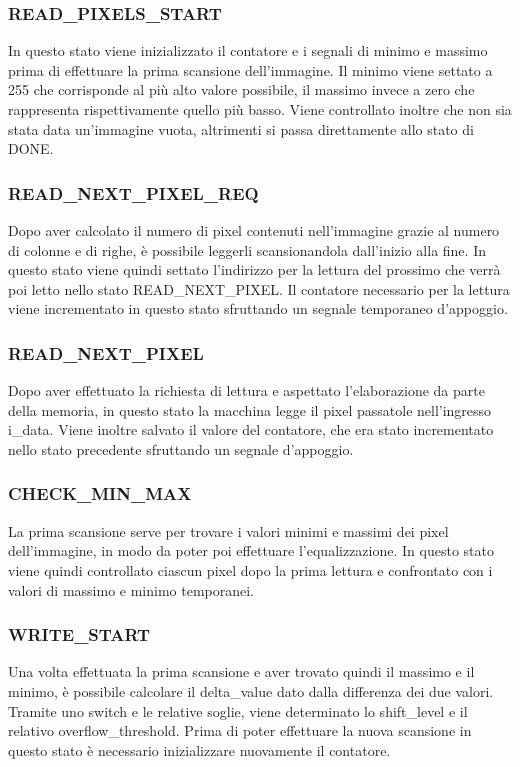 \documentclass{article}
\begin{document}
\subsubsection{READ\_PIXELS\_START}
In questo stato viene inizializzato il contatore  e i segnali di minimo e massimo prima di effettuare la prima scansione dell'immagine. Il minimo viene settato a 255 che corrisponde al più alto valore possibile, il massimo invece a zero che rappresenta rispettivamente quello più basso. Viene controllato inoltre che non sia stata data un'immagine vuota, altrimenti si passa direttamente allo stato di DONE.

\subsubsection{READ\_NEXT\_PIXEL\_REQ}
Dopo aver calcolato il numero di pixel contenuti nell'immagine grazie al numero di colonne e di righe, è possibile leggerli scansionandola dall'inizio alla fine. In questo stato viene quindi settato l'indirizzo per la lettura del prossimo che verrà poi letto nello stato READ\_NEXT\_PIXEL. Il contatore necessario per la lettura viene incrementato in questo stato sfruttando un segnale temporaneo d'appoggio.

\subsubsection{READ\_NEXT\_PIXEL}
Dopo aver effettuato la richiesta di lettura e aspettato l'elaborazione da parte della memoria, in questo stato la macchina legge il pixel passatole nell'ingresso i\_data. Viene inoltre salvato il valore del contatore, che era stato incrementato nello stato precedente sfruttando un segnale d'appoggio.

\subsubsection{CHECK\_MIN\_MAX}
La prima scansione serve per trovare i valori minimi e massimi dei pixel dell'immagine, in modo da poter poi effettuare l'equalizzazione. In questo stato viene quindi controllato ciascun pixel dopo la prima lettura e confrontato con i valori di massimo e minimo temporanei.

\subsubsection{WRITE\_START}
Una volta effettuata la prima scansione e aver trovato quindi il massimo e il minimo, è possibile calcolare il delta\_value dato dalla differenza dei due valori. Tramite uno switch e le relative soglie, viene determinato lo shift\_level e il relativo overflow\_threshold. Prima di poter effettuare la nuova scansione in questo stato è necessario inizializzare nuovamente il contatore.
\end{document}
